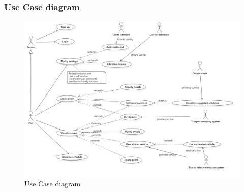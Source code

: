	\subsubsection{Use Case diagram}
		\smallskip
		\begin{figure}[H]	
			\centerline{\includegraphics[width=\paperwidth-1]{Images/UseCaseDiagram}}
			\caption{Use Case diagram}
		\end{figure}


		\renewcommand{\arraystretch}{1.6} %
		
